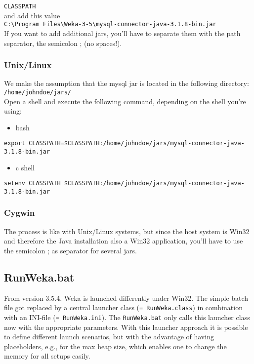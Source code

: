 \verb=CLASSPATH=\\

\noindent and add this value\\

\verb=C:\Program Files\Weka-3-5\mysql-connector-java-3.1.8-bin.jar=\\

\noindent If you want to add additional jars, you'll have to separate them with the path separator, the semicolon ; (no spaces!). 

\subsubsection*{Unix/Linux}

We make the assumption that the mysql jar is located in the following directory:\\

\verb=/home/johndoe/jars/=\\

\noindent Open a shell and execute the following command, depending on the shell you're using:

\begin{itemize}
\item bash
\end{itemize}

\verb_export CLASSPATH=$CLASSPATH:/home/johndoe/jars/mysql-connector-java-3.1.8-bin.jar_

\begin{itemize}
\item c shell
\end{itemize}

\verb_setenv CLASSPATH $CLASSPATH:/home/johndoe/jars/mysql-connector-java-3.1.8-bin.jar_

\subsubsection*{Cygwin}

The process is like with Unix/Linux systems, but since the host system
is Win32 and therefore the Java installation also a Win32 application,
you'll have to use the semicolon ; as separator for several jars.

\subsection{RunWeka.bat}
\label{RunWeka.ini}

From version 3.5.4, Weka is launched differently under Win32. The
simple batch file got replaced by a central launcher class
(\verb_= RunWeka.class_) in combination with an INI-file
 (\verb_= RunWeka.ini_). The \verb=RunWeka.bat= only calls this
 launcher class now with the appropriate parameters. With this
 launcher approach it is possible to define different launch
 scenarios, but with the advantage of having placeholders, e.g., for
 the max heap size, which enables one to change the memory for all
 setups easily.

